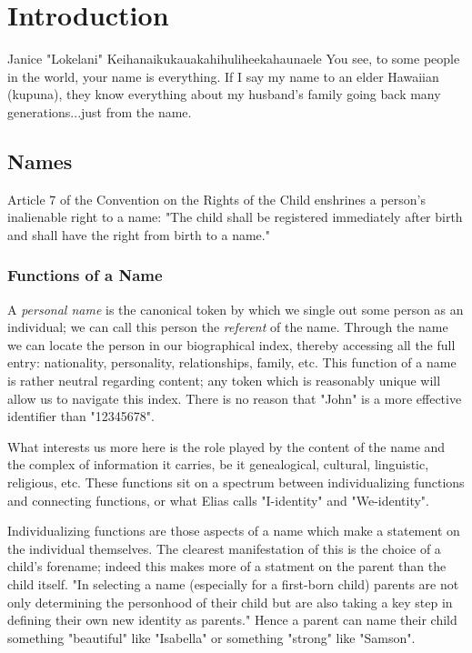 \section{Introduction}

\begin{aquote}{Janice "Lokelani" Keihanaikukauakahihuliheekahaunaele}
You see, to some people in the world, your name is everything. If I say my name
to an elder Hawaiian (kupuna), they know everything about my husband's family
going back many generations...just from the name.
\end{aquote}

\subsection{Names}

Article 7 of the Convention on the Rights of the Child enshrines a person's
inalienable right to a name: "The child shall be registered immediately after
birth and shall have the right from birth to a name." \parencite{crc}

\subsubsection{Functions of a Name}

A \textit{personal name} is the canonical token by which we single out some
person as an individual; we can call this person the \textit{referent} of the
name. Through the name we can locate the person in our biographical index,
thereby accessing all the full entry: nationality, personality, relationships,
family, etc. This function of a name is rather neutral regarding content; any
token which is reasonably unique will allow us to navigate this index. There is
no reason that "John" is a more effective identifier than "12345678".

What interests us more here is the role played by the content of the name and
the complex of information it carries, be it genealogical, cultural, linguistic,
religious, etc. These functions sit on a spectrum between individualizing
functions and connecting functions, or what Elias calls "I-identity" and
"We-identity". \parencite{elias91} \parencite[711]{finch08}

Individualizing functions are those aspects of a name which make a statement on
the individual themselves. The clearest manifestation of this is the choice of a
child's forename; indeed this makes more of a statment on the parent than the
child itself. "In selecting a name (especially for a first-born child) parents
are not only determining the personhood of their child but are also taking a key
step in defining their own new identity as parents." \parencite[718]{finch08}
Hence a parent can name their child something "beautiful" like "Isabella" or
something "strong" like "Samson".

